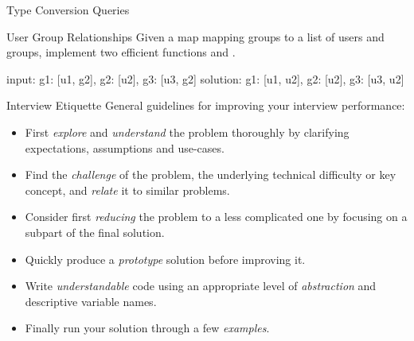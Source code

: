 \documentclass{cognito}
\begin{document}
\begin{note}{Type Conversion Queries}
\end{note}

\begin{note}{User Group Relationships}
	Given a map  mapping groups to a list
	of users and groups, implement two efficient functions 
	and .
	\begin{largecode}
 input: { g1: [u1, g2], g2: [u2], g3: [u3, g2] }
 solution: { g1: [u1, u2], g2: [u2], g3: [u3, u2] }
	\end{largecode}
\end{note}


\begin{answer}{Interview Etiquette}
	General guidelines for improving your interview performance:
	\begin{itemize}
		\item First {\it explore} and {\it understand} the problem thoroughly by clarifying
			expectations, assumptions and use-cases.
		\item Find the {\it challenge} of the problem, the underlying technical difficulty or key concept,
			and {\it relate} it to similar problems.
		\item Consider first {\it reducing} the problem to a less complicated one by focusing on a subpart of the final solution.
		\item Quickly produce a {\it prototype} solution before improving it.
		\item Write {\it understandable} code using an appropriate level of {\it abstraction} and descriptive variable names.
		\item Finally run your solution through a few {\it examples}.
	\end{itemize}
\end{answer}
\end{document}
